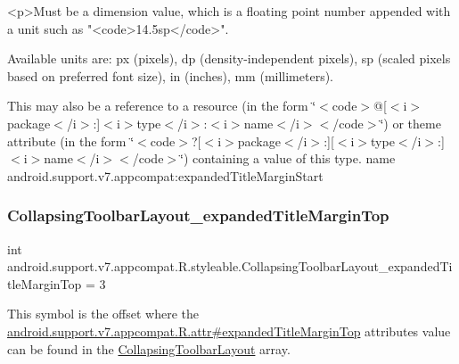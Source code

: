 \begin{DoxyVerb}      <p>Must be a dimension value, which is a floating point number appended with a unit such as "<code>14.5sp</code>".
\end{DoxyVerb}
 Available units are\+: px (pixels), dp (density-\/independent pixels), sp (scaled pixels based on preferred font size), in (inches), mm (millimeters). 

This may also be a reference to a resource (in the form \char`\"{}$<$code$>$@\mbox{[}$<$i$>$package$<$/i$>$\+:\mbox{]}$<$i$>$type$<$/i$>$\+:$<$i$>$name$<$/i$>$$<$/code$>$\char`\"{}) or theme attribute (in the form \char`\"{}$<$code$>$?\mbox{[}$<$i$>$package$<$/i$>$\+:\mbox{]}\mbox{[}$<$i$>$type$<$/i$>$\+:\mbox{]}$<$i$>$name$<$/i$>$$<$/code$>$\char`\"{}) containing a value of this type.  name android.\+support.\+v7.\+appcompat\+:expanded\+Title\+Margin\+Start \mbox{\label{classandroid_1_1support_1_1v7_1_1appcompat_1_1R_1_1styleable_a0d5fd646e714ea1e44ffb383a0fff8cf}} 
\subsubsection{\texorpdfstring{Collapsing\+Toolbar\+Layout\+\_\+expanded\+Title\+Margin\+Top}{CollapsingToolbarLayout\_expandedTitleMarginTop}}
{\footnotesize\ttfamily int android.\+support.\+v7.\+appcompat.\+R.\+styleable.\+Collapsing\+Toolbar\+Layout\+\_\+expanded\+Title\+Margin\+Top = 3\hspace{0.3cm}{\ttfamily [static]}}

This symbol is the offset where the \hyperlink{classandroid_1_1support_1_1v7_1_1appcompat_1_1R_1_1attr_a4d409c6027fc796e437be31b11a4cfaf}{android.\+support.\+v7.\+appcompat.\+R.\+attr\#expanded\+Title\+Margin\+Top} attribute\textquotesingle{}s value can be found in the \hyperlink{classandroid_1_1support_1_1v7_1_1appcompat_1_1R_1_1styleable_a8d282d917f35e5a08dd37db243410383}{Collapsing\+Toolbar\+Layout} array.

